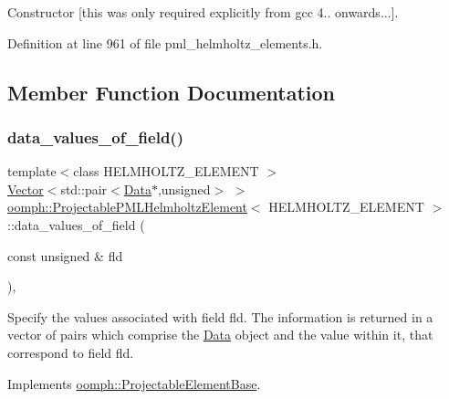 Constructor \mbox{[}this was only required explicitly from gcc 4.. onwards...\mbox{]}. 



Definition at line 961 of file pml\+\_\+helmholtz\+\_\+elements.\+h.



\subsection{Member Function Documentation}
\mbox{\label{classoomph_1_1ProjectablePMLHelmholtzElement_a7bae5d4f8a8716c9db2119094f9f08bc}} 
\subsubsection{\texorpdfstring{data\+\_\+values\+\_\+of\+\_\+field()}{data\_values\_of\_field()}}
{\footnotesize\ttfamily template$<$class H\+E\+L\+M\+H\+O\+L\+T\+Z\+\_\+\+E\+L\+E\+M\+E\+NT $>$ \\
\hyperlink{classoomph_1_1Vector}{Vector}$<$std\+::pair$<$\hyperlink{classoomph_1_1Data}{Data}$\ast$,unsigned$>$ $>$ \hyperlink{classoomph_1_1ProjectablePMLHelmholtzElement}{oomph\+::\+Projectable\+P\+M\+L\+Helmholtz\+Element}$<$ H\+E\+L\+M\+H\+O\+L\+T\+Z\+\_\+\+E\+L\+E\+M\+E\+NT $>$\+::data\+\_\+values\+\_\+of\+\_\+field (\begin{DoxyParamCaption}\item[{const unsigned \&}]{fld }\end{DoxyParamCaption})\hspace{0.3cm}{\ttfamily [inline]}, {\ttfamily [virtual]}}



Specify the values associated with field fld. The information is returned in a vector of pairs which comprise the \hyperlink{classoomph_1_1Data}{Data} object and the value within it, that correspond to field fld. 



Implements \hyperlink{classoomph_1_1ProjectableElementBase_a644306ebdf16f334344c2d27d72f18b7}{oomph\+::\+Projectable\+Element\+Base}.



